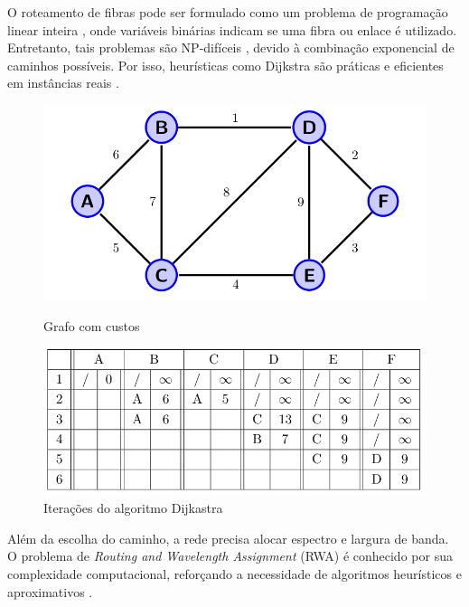 O roteamento de fibras pode ser formulado como um problema de programação
linear inteira \cite{griva2008linear}, onde variáveis binárias indicam se uma
fibra ou enlace é utilizado. Entretanto, tais problemas são NP-difíceis
\cite{artigorwa}, devido à combinação exponencial de caminhos possíveis. Por
isso, heurísticas como Dijkstra são práticas e eficientes em instâncias reais
\cite{mukherjee2020springer}.

\begin{figure}
  \begin{minipage}[c]{0.42\linewidth}
	\includegraphics[width=\linewidth]{./images/dijkastra_01.png}
	\caption{Grafo com custos}
	\label{fig:dijkastra_graph}
  \end{minipage}
  \hfill
  \begin{minipage}[c]{0.57\linewidth}
	\includegraphics[width=\linewidth]{./images/dijkastra_02.png}
	\caption{Iterações do algoritmo Dijkastra}
	\label{fig:dijkastra_table}
  \end{minipage}
\end{figure}


Além da escolha do caminho, a rede precisa alocar espectro e largura de banda.
O problema de \textit{Routing and Wavelength Assignment} (RWA) é conhecido por
sua complexidade computacional, reforçando a necessidade de algoritmos
heurísticos e aproximativos \cite{artigorwa}.

